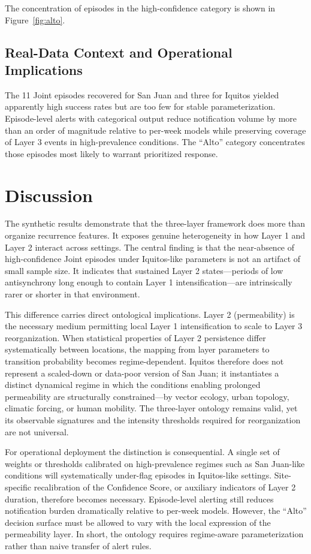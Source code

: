 \documentclass[11pt,a4paper]{article}
\begin{document}
The concentration of episodes in the high-confidence category is shown in Figure~\ref{fig:alto}.

\subsection{Real-Data Context and Operational Implications}

The 11 Joint episodes recovered for San Juan and three for Iquitos yielded apparently high success rates but are too few for stable parameterization. Episode-level alerts with categorical output reduce notification volume by more than an order of magnitude relative to per-week models while preserving coverage of Layer 3 events in high-prevalence conditions. The “Alto” category concentrates those episodes most likely to warrant prioritized response.

\section{Discussion}

The synthetic results demonstrate that the three-layer framework does more than organize recurrence features. It exposes genuine heterogeneity in how Layer 1 and Layer 2 interact across settings. The central finding is that the near-absence of high-confidence Joint episodes under Iquitos-like parameters is not an artifact of small sample size. It indicates that sustained Layer 2 states---periods of low antisynchrony long enough to contain Layer 1 intensification---are intrinsically rarer or shorter in that environment.

This difference carries direct ontological implications. Layer 2 (permeability) is the necessary medium permitting local Layer 1 intensification to scale to Layer 3 reorganization. When statistical properties of Layer 2 persistence differ systematically between locations, the mapping from layer parameters to transition probability becomes regime-dependent. Iquitos therefore does not represent a scaled-down or data-poor version of San Juan; it instantiates a distinct dynamical regime in which the conditions enabling prolonged permeability are structurally constrained---by vector ecology, urban topology, climatic forcing, or human mobility. The three-layer ontology remains valid, yet its observable signatures and the intensity thresholds required for reorganization are not universal.

For operational deployment the distinction is consequential. A single set of weights or thresholds calibrated on high-prevalence regimes such as San Juan-like conditions will systematically under-flag episodes in Iquitos-like settings. Site-specific recalibration of the Confidence Score, or auxiliary indicators of Layer 2 duration, therefore becomes necessary. Episode-level alerting still reduces notification burden dramatically relative to per-week models. However, the ``Alto'' decision surface must be allowed to vary with the local expression of the permeability layer. In short, the ontology requires regime-aware parameterization rather than naive transfer of alert rules.
\end{document}
